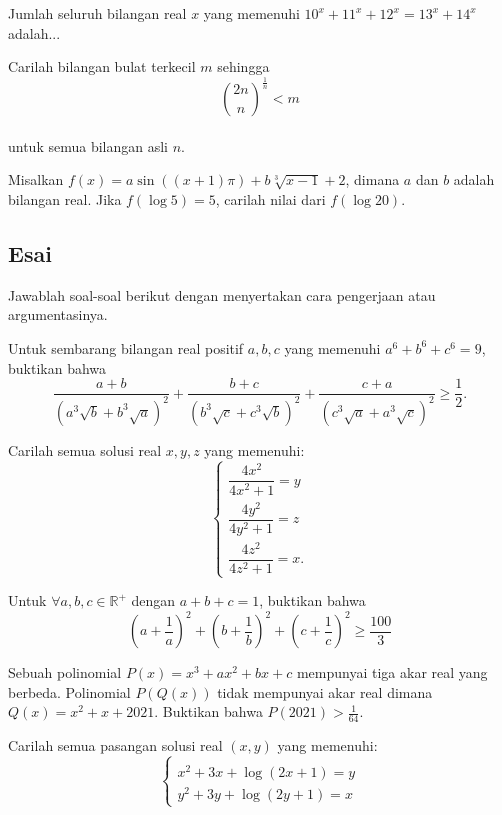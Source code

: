 \documentclass[12pt]{scrartcl}
\begin{document}
	\begin{soalbaru}
		Jumlah seluruh bilangan real $x$ yang memenuhi $10^x+11^x+12^x=13^x+14^x$ adalah... %
	\end{soalbaru}

	\begin{soalbaru}
		Carilah bilangan bulat terkecil $m$ sehingga\\[-15pt] $${2n \choose n}^{\frac{1}{n}}<m$$\\[-20pt] untuk semua bilangan asli $n$.%
	\end{soalbaru}
	
	\begin{soalbaru}
		Misalkan $f(x)=a\sin((x+1)\pi) + b\sqrt[3]{x-1}+2$, dimana $a$ dan $b$ adalah bilangan real. Jika $f(\log 5)=5$, carilah nilai dari $f(\log 20)$.
	\end{soalbaru}

\subsection{Esai}
Jawablah soal-soal berikut dengan menyertakan cara pengerjaan atau argumentasinya.
	
	
	\begin{soalbaru} Untuk sembarang bilangan real positif $a,b,c$ yang memenuhi $a^6+b^6+c^6=9$, buktikan bahwa $$\dfrac{a+b}{(a^3\sqrt{b}+b^3\sqrt{a})^2}+\dfrac{b+c}{(b^3\sqrt{c}+c^3\sqrt{b})^2}+\dfrac{c+a}{(c^3\sqrt{a}+a^3\sqrt{c})^2} \ge \dfrac{1}{2}.$$
		\end{soalbaru}
	
	
	\begin{soalbaru} 
		 Carilah semua solusi real  $x,y,z$ yang memenuhi: 
		 		$$\begin{cases}
		 		\dfrac{4x^2}{4x^2+1}=y \\[5pt]
		 		\dfrac{4y^2}{4y^2+1}=z \\[5pt]
		 		\dfrac{4z^2}{4z^2+1}=x.
		 		\end{cases}$$
	\end{soalbaru}
	
	\begin{soalbaru} 
		 Untuk $\forall a,b,c \in\mathbb{R^+}$ dengan $a+b+c=1$, buktikan bahwa $$\left( a+\frac{1}{a} \right)^2+\left( b+\frac{1}{b} \right)^2+\left( c+\frac{1}{c} \right)^2 \ge \frac{100}{3}$$
	\end{soalbaru}
	
	\begin{soalbaru}
		Sebuah polinomial $P(x)=x^3+ax^2+bx+c$ mempunyai tiga akar real yang berbeda. Polinomial $P(Q(x))$ tidak mempunyai akar real dimana $Q(x)=x^2+x+2021$. Buktikan bahwa $P(2021)>\frac{1}{64}$.
	\end{soalbaru}
	
	\begin{soalbaru}
		Carilah semua pasangan solusi real $(x,y)$ yang memenuhi:\\[-10pt] 
				 		$$\begin{cases}\\[-30pt]
				 		x^2+3x+\log(2x+1)=y \\[-5pt]
				 		y^2+3y+\log(2y+1)=x
				 		\end{cases}$$
	\end{soalbaru}
	
\end{document}
